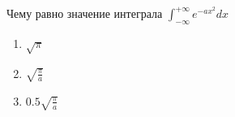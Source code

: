 Чему равно значение интеграла \(\int_{-\infty }^{+\infty } e^{-ax^2}dx\)

\begin{enumerate}[label=\arabic*)]
    \item \(\sqrt{\pi }\)
    \item \(\sqrt{\frac{\pi }{a}}\)
    \item \(0.5\sqrt{\frac{\pi }{a}}\)
\end{enumerate}

